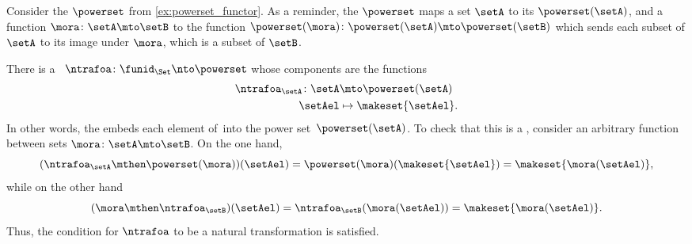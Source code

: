 \begin{example}
    Consider the   $\powerset$ from \cref{ex:powerset_functor}.
    As a reminder, the   $\powerset$ maps a set $\setA$ to its  $\powerset(\setA)$, and a function $\mora \colon \setA \mto \setB$ to the function $\powerset(\mora) \colon \powerset(\setA) \mto \powerset(\setB)$ which sends each subset of $\setA$ to its image under $\mora$, which is a subset of $\setB$.

    There is a ~$\ntrafoa\colon \funid_\Set \nto \powerset$ whose components are the functions
    \begin{equation}
        \begin{aligned}
            \ntrafoa_\setA\colon \setA & \mto \powerset(\setA) \\
            \setAel                    & \mapsto \makeset{\setAel}.
        \end{aligned}
    \end{equation}
    In other words, the  embeds each element of~\setA into the power set~$\powerset(\setA)$.
    To check that this is a , consider an arbitrary function between sets $\mora\colon \setA\mto \setB$.
    On the one hand,
    \begin{equation}
        (\ntrafoa_\setA \mthen \powerset(\mora))(\setAel)
        = \powerset(\mora)(\makeset{\setAel}) =\makeset{\mora(\setAel)},
    \end{equation}
    while on the other hand
    \begin{equation}
        (\mora \mthen \ntrafoa_\setB)(\setAel) = \ntrafoa_\setB (\mora(\setAel)) = \makeset{\mora(\setAel)}.
    \end{equation}
    Thus, the condition for $\ntrafoa$ to be a natural transformation is satisfied.
\end{example}


